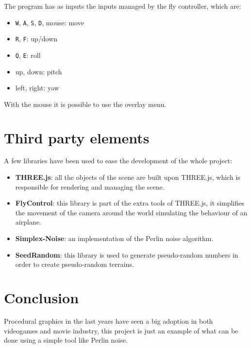 \documentclass[paper=a4, fontsize=11pt]{scrartcl} %
\numberwithin{equation}{section} %
\numberwithin{figure}{section} %
\numberwithin{table}{section} %
\theoremstyle{definition}
\begin{document}
The program has as inputs the inputs managed by the fly controller, which are:

\begin{itemize}
	\item \texttt{W}, \texttt{A}, \texttt{S}, \texttt{D}, mouse: move
	\item \texttt{R}, \texttt{F}: up/down
	\item \texttt{Q}, \texttt{E}: roll
	\item up, down: pitch
	\item left, right: yaw
\end{itemize}

With the mouse it is possible to use the overlay menu.


\section{Third party elements}

A few libraries have been used to ease the development of the whole project:

\begin{itemize}
	\item \textbf{THREE.js}: all the objects of the scene are built upon
		THREE.js, which is responsible for rendering and managing the scene.
	\item \textbf{FlyControl}: this library is part of the extra tools of
		THREE.js, it simplifies the movement of the camera around the world
		simulating the behaviour of an airplane.
	\item \textbf{Simplex-Noise}: an implementation of the Perlin noise
		algorithm.
	\item \textbf{SeedRandom}: this library is used to generate pseudo-random
		numbers in order to create pseudo-random terrains.
\end{itemize}


\section{Conclusion}

Procedural graphics in the last years have seen a big adoption in both videogames
and movie industry, this project is just an example of what can be done using
a simple tool like Perlin noise.
\end{document}
